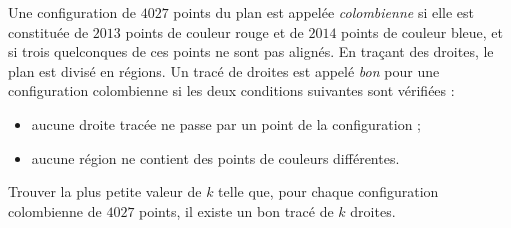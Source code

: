 Une configuration de $4027$ points du plan est appelée \emph{colombienne} si elle est constituée de $2013$
points de couleur rouge et de $2014$ points de couleur bleue, et si trois quelconques de ces points ne sont
pas alignés. En traçant des droites, le plan est divisé en régions. Un tracé de droites est appelé \emph{bon}
pour une configuration colombienne si les deux conditions suivantes sont vérifiées :
\begin{itemize}
  \item aucune droite tracée ne passe par un point de la configuration ;
  \item aucune région ne contient des points de couleurs différentes.
\end{itemize}
Trouver la plus petite valeur de $k$ telle que, pour chaque configuration colombienne de $4027$ points, il
existe un bon tracé de $k$ droites.
